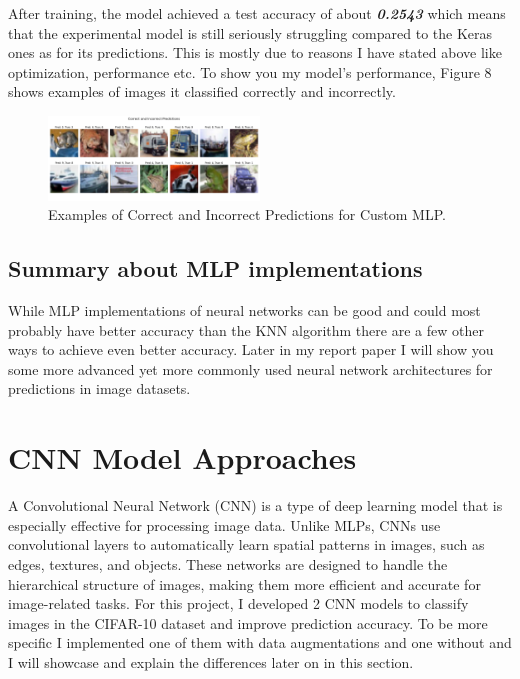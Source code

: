 \documentclass[lettersize,journal]{IEEEtran}
\begin{document}
After training, the model achieved a test accuracy of about \textbf{\textit{0.2543}} which means that the experimental model is still seriously struggling compared to the Keras ones as for its predictions. This is mostly due to reasons I have stated above like optimization, performance etc. To show you my model's performance, Figure 8 shows examples of images it classified correctly and incorrectly.

\begin{figure}[h!]
    \centering
    \includegraphics[width=0.5\textwidth]{sample_predictions_custom_mlp.png}
    \caption{Examples of Correct and Incorrect Predictions for Custom MLP.}
    \label{fig:custom_sample_predictions}
\end{figure}

\subsection{\textbf{Summary about MLP implementations}}
While MLP implementations of neural networks can be good and could most probably have better accuracy than the KNN algorithm there are a few other ways to achieve even better accuracy.
Later in my report paper I will show you some more advanced yet more commonly used neural network architectures for predictions in image datasets.

\section{CNN Model Approaches}
A Convolutional Neural Network (CNN) is a type of deep learning model that is especially effective for processing image data. Unlike MLPs, CNNs use convolutional layers to automatically learn spatial patterns in images, such as edges, textures, and objects. These networks are designed to handle the hierarchical structure of images, making them more efficient and accurate for image-related tasks. For this project, I developed 2 CNN models to classify images in the CIFAR-10 dataset and improve prediction accuracy. To be more specific I implemented one of them with data augmentations and one without and I will showcase and explain the differences later on in this section.
\end{document}
